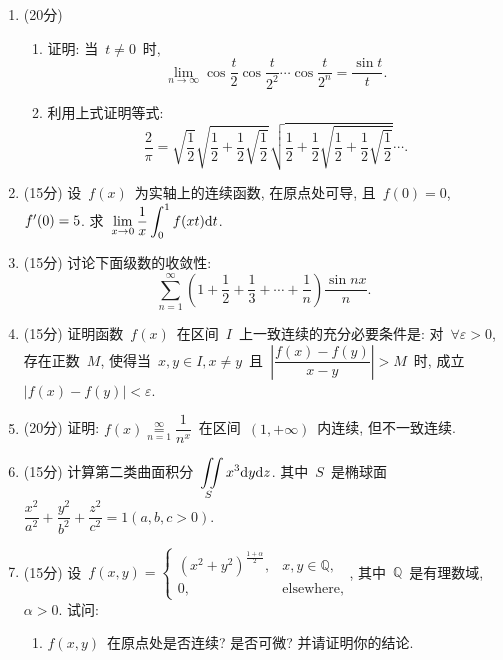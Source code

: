 \documentclass[UTF8,a4paper,11pt]{article}
\begin{document}
\begin{enumerate}
	\item (20分)
	      \begin{enumerate}
		      \item 证明: 当~$t\neq 0$~时,
		            \[ \lim_{n\to\infty} \cos\dfrac{t}{2}\cos\dfrac{t}{2^2}\cdots\cos\dfrac{t}{2^n}=\dfrac{\sin{t}}{t}.\]
		      \item 利用上式证明等式:
		            \[ \dfrac{2}{\pi}=\sqrt{\dfrac{1}{2}}\sqrt{\dfrac{1}{2}+\dfrac{1}{2}\sqrt{\dfrac{1}{2}}}\sqrt{\dfrac{1}{2}+\dfrac{1}{2}\sqrt{\dfrac{1}{2}+\dfrac{1}{2}\sqrt{\dfrac{1}{2}}}}\cdots.\]
	      \end{enumerate}
	      \vspace{2em}
	\item (15分) 设~$f(x)$~为实轴上的连续函数, 在原点处可导, 且~$f(0)=0$, $f\rq{}(0)=5$. 求~$\displaystyle\lim\limits_{x\to 0}\dfrac{1}{x}\int_0^1f(xt)\mathrm{d}t$.
	      \vspace{2em}
	\item (15分) 讨论下面级数的收敛性:
	      \[\sum_{n=1}^{\infty}\left(1+\dfrac{1}{2}+\dfrac{1}{3}+\cdots+\dfrac{1}{n}\right)\dfrac{\sin{nx}}{n}.\]
	      \vspace{2em}
	\item (15分) 证明函数~$f(x)$~在区间~$I$~上一致连续的充分必要条件是: 对~$\forall\varepsilon>0$, 存在正数~$M$, 使得当~$x,y\in I,x\neq y$~且~$\left|\dfrac{f(x)-f(y)}{x-y}\right|>M$~时, 成立~$|f(x)-f(y)|<\varepsilon$.
	      \vspace{2em}
	\item (20分) 证明: $f(x)=\limits_{n=1}^{\infty}\dfrac{1}{n^x}$~在区间~$(1,+\infty)$~内连续, 但不一致连续.
	      \vspace{2em}
	\item (15分) 计算第二类曲面积分~$\displaystyle\iint\limits_S x^3\mathrm{d}y\mathrm{d}z$. 其中~$S$~是椭球面~$\dfrac{x^2}{a^2}+\dfrac{y^2}{b^2}+\dfrac{z^2}{c^2}=1 (a,b,c>0)$.
	      \vspace{2em}
	\item (15分) 设~$f(x,y)=\begin{cases}(x^2+y^2)^{\frac{1+\alpha}{2}}, & x,y\in\mathbb{Q},\\0,& \text{elsewhere,}\end{cases}$, 其中~$\mathbb{Q}$~是有理数域, $\alpha>0$. 试问:
	      \begin{enumerate}
		      \item $f(x,y)$~在原点处是否连续? 是否可微? 并请证明你的结论.

\end{enumerate}
\end{enumerate}
\end{document}
